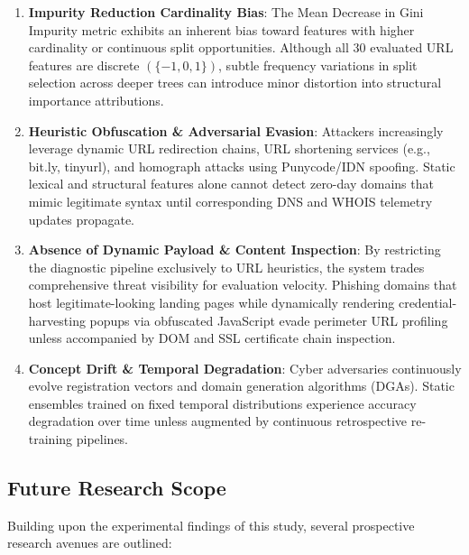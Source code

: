 \begin{enumerate}
    \item \textbf{Impurity Reduction Cardinality Bias}:
    The Mean Decrease in Gini Impurity metric exhibits an inherent bias toward features with higher cardinality or continuous split opportunities. Although all 30 evaluated URL features are discrete $(\{-1, 0, 1\})$, subtle frequency variations in split selection across deeper trees can introduce minor distortion into structural importance attributions.
    
    \item \textbf{Heuristic Obfuscation \& Adversarial Evasion}:
    Attackers increasingly leverage dynamic URL redirection chains, URL shortening services (e.g., bit.ly, tinyurl), and homograph attacks using Punycode/IDN spoofing. Static lexical and structural features alone cannot detect zero-day domains that mimic legitimate syntax until corresponding DNS and WHOIS telemetry updates propagate.
    
    \item \textbf{Absence of Dynamic Payload \& Content Inspection}:
    By restricting the diagnostic pipeline exclusively to URL heuristics, the system trades comprehensive threat visibility for evaluation velocity. Phishing domains that host legitimate-looking landing pages while dynamically rendering credential-harvesting popups via obfuscated JavaScript evade perimeter URL profiling unless accompanied by DOM and SSL certificate chain inspection.
    
    \item \textbf{Concept Drift \& Temporal Degradation}:
    Cyber adversaries continuously evolve registration vectors and domain generation algorithms (DGAs). Static ensembles trained on fixed temporal distributions experience accuracy degradation over time unless augmented by continuous retrospective re-training pipelines.
\end{enumerate}

\subsection{Future Research Scope}
Building upon the experimental findings of this study, several prospective research avenues are outlined:

